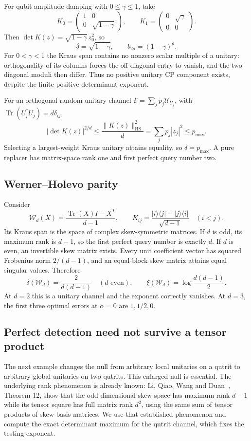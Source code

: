\documentclass[11pt,a4paper]{article}
\theoremstyle{remark}\newtheorem{remark}[theorem]{Remark}
\DeclareMathOperator{\Tr}{Tr}
\newcommand{\E}{\mathcal E}
\newcommand{\U}{\mathcal U}
\newcommand{\ket}[1]{\lvert #1\rangle}
\newcommand{\bra}[1]{\langle #1\rvert}
\newcommand{\HS}{\mathrm{HS}}
\begin{document}
For qubit amplitude damping with $0\le\gamma\le1$, take
\[
K_0=\begin{pmatrix}1&0\\0&\sqrt{1-\gamma}\end{pmatrix},\qquad
K_1=\begin{pmatrix}0&\sqrt\gamma\\0&0\end{pmatrix}.
\]
Then $\det K(z)=\sqrt{1-\gamma}\,z_0^2$, so
\[
\delta=\sqrt{1-\gamma},\qquad b_{2a}=(1-\gamma)^a.
\]
For $0<\gamma<1$ the Kraus span contains no nonzero scalar multiple of a unitary: orthogonality of its columns forces the off-diagonal entry to vanish, and the two diagonal moduli then differ. Thus no positive unitary CP component exists, despite the finite positive determinant exponent.

For an orthogonal random-unitary channel $\E=\sum_jp_j\U_{U_j}$, with $\Tr(U_i^\dagger U_j)=d\delta_{ij}$,
\[
|\det K(z)|^{2/d}\le\frac{\|K(z)\|_\HS^2}{d}
=\sum_jp_j|z_j|^2\le p_{\max}.
\]
Selecting a largest-weight Kraus unitary attains equality, so $\delta=p_{\max}$. A pure replacer has matrix-space rank one and first perfect query number two.

\subsection{Werner--Holevo parity}
Consider
\[
\mathcal W_d(X)=\frac{\Tr(X)I-X^T}{d-1},\qquad
K_{ij}=\frac{\ket i\bra j-\ket j\bra i}{\sqrt{d-1}}\quad(i<j).
\]
Its Kraus span is the space of complex skew-symmetric matrices. If $d$ is odd, its maximum rank is $d-1$, so the first perfect query number is exactly $d$. If $d$ is even, an invertible skew matrix exists. Every unit coefficient vector has squared Frobenius norm $2/(d-1)$, and an equal-block skew matrix attains equal singular values. Therefore
\begin{equation}
\delta(\mathcal W_d)=\frac{2}{d(d-1)}\quad(d\text{ even}),\qquad
\xi(\mathcal W_d)=\log\frac{d(d-1)}2.
\end{equation}
At $d=2$ this is a unitary channel and the exponent correctly vanishes. At $d=3$, the first three optimal errors at $\alpha=0$ are $1,1/2,0$.

\subsection{Perfect detection need not survive a tensor product}
The next example changes the null from arbitrary local unitaries on a qutrit to arbitrary global unitaries on two qutrits. This enlarged null is essential. The underlying rank phenomenon is already known: Li, Qiao, Wang and Duan~\cite{li}, Theorem 12, show that the odd-dimensional skew space has maximum rank $d-1$ while its tensor square has full matrix rank $d^2$, using the same sum of tensor products of skew basis matrices. We use that established phenomenon and compute the exact determinant maximum for the qutrit channel, which fixes the testing exponent.
\end{document}
